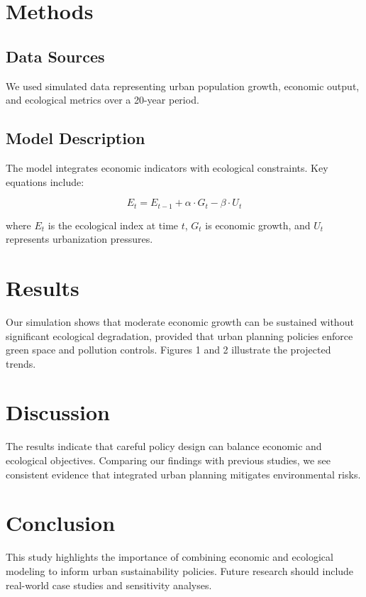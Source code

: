 \documentclass[
  authoryear,
  5p,
  twocolumn]{elsarticle}
\begin{document}
\section{Methods}\label{methods}

\subsection{Data Sources}\label{data-sources}

We used simulated data representing urban population growth, economic
output, and ecological metrics over a 20-year period.

\subsection{Model Description}\label{model-description}

The model integrates economic indicators with ecological constraints.
Key equations include:

\[
E_t = E_{t-1} + \alpha \cdot G_t - \beta \cdot U_t
\]

where \(E_t\) is the ecological index at time \(t\), \(G_t\) is economic
growth, and \(U_t\) represents urbanization pressures.

\section{Results}\label{results}

Our simulation shows that moderate economic growth can be sustained
without significant ecological degradation, provided that urban planning
policies enforce green space and pollution controls. Figures 1 and 2
illustrate the projected trends.

\section{Discussion}\label{discussion}

The results indicate that careful policy design can balance economic and
ecological objectives. Comparing our findings with previous studies, we
see consistent evidence that integrated urban planning mitigates
environmental risks.

\section{Conclusion}\label{conclusion}

This study highlights the importance of combining economic and
ecological modeling to inform urban sustainability policies. Future
research should include real-world case studies and sensitivity
analyses.
\end{document}

